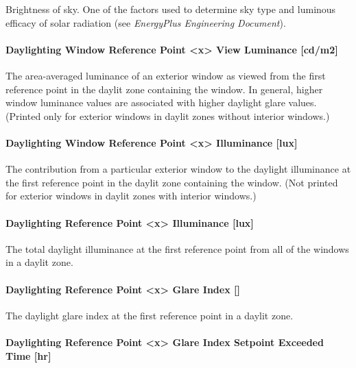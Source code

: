 Brightness of sky. One of the factors used to determine sky type and luminous efficacy of solar radiation (see \emph{EnergyPlus Engineering Document}).

\paragraph{Daylighting Window Reference Point <x> View Luminance {[}cd/m2{]}}\label{daylighting-window-reference-point-1-view-luminance-cdm2}

The area-averaged luminance of an exterior window as viewed from the first reference point in the daylit zone containing the window. In general, higher window luminance values are associated with higher daylight glare values. (Printed only for exterior windows in daylit zones without interior windows.)

\paragraph{Daylighting Window Reference Point <x> Illuminance {[}lux{]}}\label{daylighting-window-reference-point-1-illuminance-lux}

The contribution from a particular exterior window to the daylight illuminance at the first reference point in the daylit zone containing the window. (Not printed for exterior windows in daylit zones with interior windows.)

\paragraph{Daylighting Reference Point <x> Illuminance {[}lux{]}}\label{daylighting-reference-point-1-illuminance-lux}

The total daylight illuminance at the first reference point from all of the windows in a daylit zone.

\paragraph{Daylighting Reference Point <x> Glare Index {[]}}\label{daylighting-reference-point-1-glare-index}

The daylight glare index at the first reference point in a daylit zone.

\paragraph{Daylighting Reference Point <x> Glare Index Setpoint Exceeded Time {[}hr{]}}\label{daylighting-reference-point-1-glare-index-setpoint-exceeded-time-hr}

